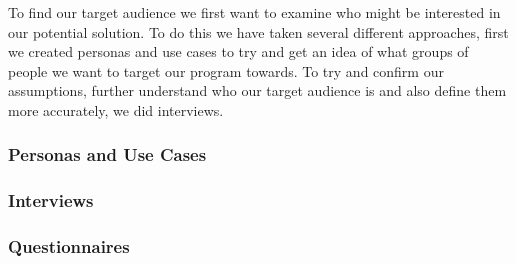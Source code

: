 To find our target audience we first want to examine who might be interested in our potential solution. To do this we have taken several different approaches, first we created personas and use cases to try and get an idea of what groups of people we want to target our program towards. To try and confirm our assumptions, further understand who our target audience is and also define them more accurately, we did interviews.
\subsubsection{Personas and Use Cases}
\label{UseCases}

\subsubsection{Interviews}
\label{AudInterview}

\subsubsection{Questionnaires}
\label{AudQuestionnaire}
